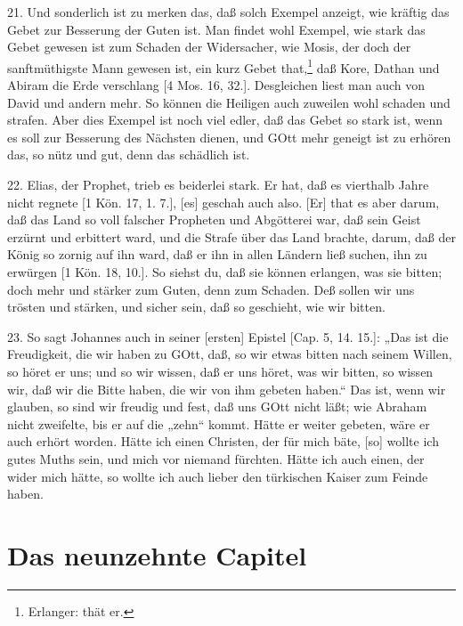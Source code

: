 21. Und sonderlich ist zu merken das, daß solch Exempel anzeigt, wie kräftig das Gebet zur Besserung der Guten ist. Man findet wohl Exempel, wie stark das Gebet gewesen ist zum Schaden der Widersacher, wie Mosis, der doch der sanftmüthigste Mann gewesen ist, ein kurz Gebet that,\footnote{Erlanger: thät er.} daß Kore, Dathan und Abiram die Erde verschlang [4 Mos. 16, 32.]. Desgleichen liest man auch von David und andern mehr. So können die Heiligen auch zuweilen wohl schaden und strafen. Aber dies Exempel ist noch viel edler, daß das Gebet so stark ist, wenn es soll zur Besserung des Nächsten dienen, und GOtt mehr geneigt ist zu erhören das, so nütz und gut, denn das schädlich ist.

22. Elias, der Prophet, trieb es beiderlei stark. Er hat, daß es vierthalb Jahre nicht regnete [1 Kön. 17, 1. 7.], [es] geschah auch also. [Er] that es aber darum, daß das Land so voll falscher Propheten und Abgötterei war, daß sein Geist erzürnt und erbittert ward, und die Strafe über das Land brachte, darum, daß der König so zornig auf ihn ward, daß er ihn
in allen Ländern ließ suchen, ihn zu erwürgen [1 Kön. 18, 10.]. So siehst du, daß sie können erlangen, was sie bitten; doch mehr und stärker zum Guten, denn zum Schaden. Deß sollen wir uns trösten und stärken, und sicher sein, daß so geschieht, wie wir bitten.

23. So sagt Johannes auch in seiner [ersten] Epistel [Cap. 5, 14. 15.]: „Das ist die Freudigkeit, die wir haben zu GOtt, daß, so wir etwas bitten nach seinem Willen, so höret er uns; und so wir wissen, daß er uns höret, was wir bitten, so wissen wir, daß wir die Bitte haben, die wir von ihm gebeten haben.“ Das ist, wenn wir glauben, so sind wir freudig und fest, daß uns GOtt nicht läßt; wie Abraham nicht zweifelte, bis er auf die „zehn“ kommt. Hätte er weiter gebeten, wäre er auch erhört worden. Hätte ich einen Christen, der für mich bäte, [so] wollte ich gutes Muths sein, und mich vor niemand fürchten. Hätte ich auch einen, der wider mich hätte, so wollte ich auch lieber den türkischen Kaiser zum Feinde haben.

\section{Das neunzehnte Capitel}

